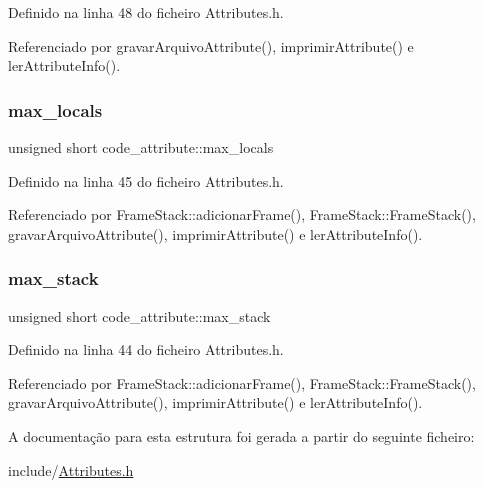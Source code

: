 Definido na linha 48 do ficheiro Attributes.\+h.



Referenciado por gravar\+Arquivo\+Attribute(), imprimir\+Attribute() e ler\+Attribute\+Info().

\mbox{\label{structcode__attribute_aa5c39f7692d14498f497ac2425595dda}} 
\subsubsection{\texorpdfstring{max\+\_\+locals}{max\_locals}}
{\footnotesize\ttfamily unsigned short code\+\_\+attribute\+::max\+\_\+locals}



Definido na linha 45 do ficheiro Attributes.\+h.



Referenciado por Frame\+Stack\+::adicionar\+Frame(), Frame\+Stack\+::\+Frame\+Stack(), gravar\+Arquivo\+Attribute(), imprimir\+Attribute() e ler\+Attribute\+Info().

\mbox{\label{structcode__attribute_ad8f0d9ec65c9065df510fb7313133eb0}} 
\subsubsection{\texorpdfstring{max\+\_\+stack}{max\_stack}}
{\footnotesize\ttfamily unsigned short code\+\_\+attribute\+::max\+\_\+stack}



Definido na linha 44 do ficheiro Attributes.\+h.



Referenciado por Frame\+Stack\+::adicionar\+Frame(), Frame\+Stack\+::\+Frame\+Stack(), gravar\+Arquivo\+Attribute(), imprimir\+Attribute() e ler\+Attribute\+Info().



A documentação para esta estrutura foi gerada a partir do seguinte ficheiro\+:\begin{DoxyCompactItemize}
\item 
include/\hyperlink{Attributes_8h}{Attributes.\+h}\end{DoxyCompactItemize}
